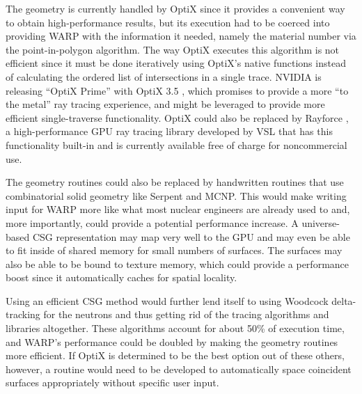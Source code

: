 The geometry is currently handled by OptiX since it provides a convenient way to obtain high-performance results, but its execution had to be coerced into providing WARP with the information it needed, namely the material number via the point-in-polygon algorithm.  The way OptiX executes this algorithm is not efficient since it must be done iteratively using OptiX's native functions instead of calculating the ordered list of intersections in a single trace.  NVIDIA is releasing ``OptiX Prime'' with OptiX 3.5 \cite{optix3.5}, which promises to provide a more ``to the metal'' ray tracing experience, and might be leveraged to provide more efficient single-traverse functionality.  OptiX could also be replaced by Rayforce \cite{rayforce}, a high-performance GPU ray tracing library developed by VSL that has this functionality built-in and is currently available free of charge for noncommercial use.

The geometry routines could also be replaced by handwritten routines that use combinatorial solid geometry like Serpent and MCNP.  This would make writing input for WARP more like what most nuclear engineers are already used to and, more importantly, could provide a potential performance increase.  A universe-based CSG representation may map very well to the GPU and may even be able to fit inside of shared memory for small numbers of surfaces.  The surfaces may also be able to be bound to texture memory, which could provide a performance boost since it automatically caches for spatial locality.  

Using an efficient CSG method would further lend itself to using Woodcock delta-tracking for the neutrons and thus getting rid of the tracing algorithms and libraries altogether.  These algorithms account for about 50\% of execution time, and WARP's performance could be doubled by making the geometry routines more efficient.  If OptiX is determined to be the best option out of these others, however, a routine would need to be developed to automatically space coincident surfaces appropriately without specific user input.


